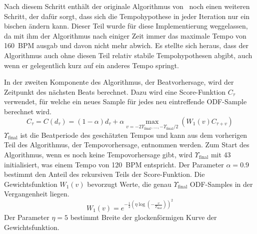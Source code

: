 {{{			%
			Nach diesem Schritt enthält der originale Algorithmus von~\cite{2009_DaPlSt} noch einen weiteren Schritt,
				der dafür sorgt,
				dass sich die Tempohypothese in jeder Iteration nur ein bischen ändern kann.
			Dieser Teil wurde für diese Implementierung weggelassen,
				da mit ihm der Algorithmus nach einiger Zeit immer das maximale Tempo von \SI{160}{BPM} ausgab
				und davon nicht mehr abwich. 
			Es stellte sich heraus,
				dass der Algorithmus auch ohne diesen Teil relativ stabile Tempohypothesen abgibt,
				auch wenn er gelegentlich kurz auf ein anderes Tempo springt.

			In der zweiten Komponente des Algorithmus,
				der Beatvorhersage,
				wird der Zeitpunkt des nächsten Beats berechnet.
			Dazu wird eine Score-Funktion $C_\tau$ verwendet,
				für welche ein neues Sample für jedes neu eintreffende ODF-Sample berechnet wird.
			\begin{equation}
				C_\tau = C(d_\tau) =
					(1 - \alpha)d_\tau +
					\alpha \max_{v = -2 \Upsilon_\text{final}, ..., -\Upsilon_\text{final} / 2}(W_1(v) C_{\tau + v})
				\label{eq:score_function}
			\end{equation}
			$\Upsilon_\text{final}$ ist die Beatperiode des geschätzten Tempos
				und kann aus dem vorherigen Teil des Algorithmus, der Tempovorhersage, entnommen werden.
			Zum Start des Algorithmus,
				wenn es noch keine Tempovorhersage gibt,
				wird $\Upsilon_\text{final}$ mit \num{43} initialisiert,
				was einem Tempo von \SI{120}{BPM} entspricht.
			Der Parameter $\alpha = 0.9$ bestimmt den Anteil des rekursiven Teils der Score-Funktion.
			Die Gewichtsfunktion $W_1(v)$ bevorzugt Werte, die genau $\Upsilon_\text{final}$ ODF-Samples in der Vergangenheit liegen.
			\begin{equation}
				W_1(v) = e^{-\frac{1}{2} \left( \eta \log \left( -\frac{v}{\Upsilon_\text{final}} \right) \right)^2}
			\end{equation}
			Der Parameter $\eta = 5$ bestimmt Breite der glockenförmigen Kurve der Gewichtsfunktion.

}}}
